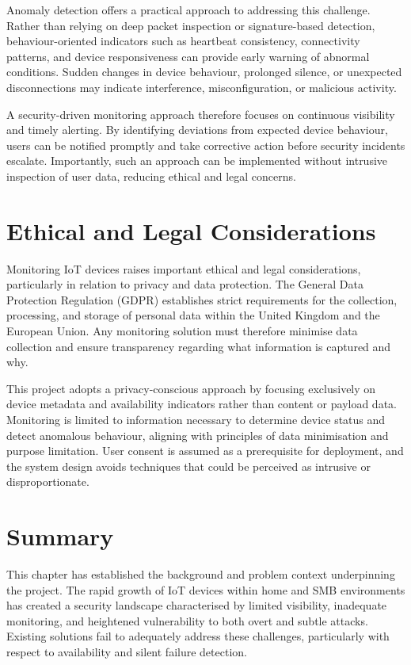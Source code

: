 Anomaly detection offers a practical approach to addressing this challenge. Rather than relying on deep packet inspection or signature-based detection, behaviour-oriented indicators such as heartbeat consistency, connectivity patterns, and device responsiveness can provide early warning of abnormal conditions. Sudden changes in device behaviour, prolonged silence, or unexpected disconnections may indicate interference, misconfiguration, or malicious activity.

A security-driven monitoring approach therefore focuses on continuous visibility and timely alerting. By identifying deviations from expected device behaviour, users can be notified promptly and take corrective action before security incidents escalate. Importantly, such an approach can be implemented without intrusive inspection of user data, reducing ethical and legal concerns.

\section{Ethical and Legal Considerations}

Monitoring IoT devices raises important ethical and legal considerations, particularly in relation to privacy and data protection. The General Data Protection Regulation (GDPR) establishes strict requirements for the collection, processing, and storage of personal data within the United Kingdom and the European Union. Any monitoring solution must therefore minimise data collection and ensure transparency regarding what information is captured and why.

This project adopts a privacy-conscious approach by focusing exclusively on device metadata and availability indicators rather than content or payload data. Monitoring is limited to information necessary to determine device status and detect anomalous behaviour, aligning with principles of data minimisation and purpose limitation. User consent is assumed as a prerequisite for deployment, and the system design avoids techniques that could be perceived as intrusive or disproportionate.

\section{Summary}

This chapter has established the background and problem context underpinning the project. The rapid growth of IoT devices within home and SMB environments has created a security landscape characterised by limited visibility, inadequate monitoring, and heightened vulnerability to both overt and subtle attacks. Existing solutions fail to adequately address these challenges, particularly with respect to availability and silent failure detection.

